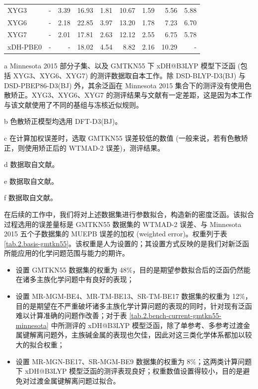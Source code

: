 \begin{table}
{\begin{tabular}{ld{1.3}d{1.3}d{2.2}d{2.2}d{2.2}d{2.2}d{2.2}d{2.2}}
  XYG3            
  & -               & 3.39 & 16.93      & 1.81        & 10.67      & 1.59       & 5.56       & 5.88     \\
  XYG6            
  & -               & 2.18 & 22.85      & 3.97        & 13.20      & 1.78       & 7.23       & 6.70     \\
  XYG7            
  & -               & 2.01 & 17.81      & 2.63        & 12.12      & 2.55       & 6.75       & 5.78     \\
  xDH-PBE0        
  & -               & -               & 18.02      & 4.54        & 8.82       & 2.16       & 10.29      & -        \\
  \bottomrule
  \end{tabular}
}{
  \item[a] Minnesota 2015 部分子集、以及 GMTKN55 下 xDH@B3LYP 模型下泛函 (包括 XYG3、XYG6、XYG7) 的测评数据取自本工作。除 DSD-BLYP-D3(BJ) 与 DSD-PBEP86-D3(BJ) 外，其余泛函在 Minnesota 2015 集合下的测评没有使用色散矫正。XYG3、XYG6、XYG7 的测评结果与文献\cite{Zhang-Xu.JPCL.2021}有一定差距，这是因为本工作与该文献使用了不同的基组与冻核近似规则。
  \item[b] 色散矫正模型均选用 DFT-D3(BJ)。
  \item[c] 在计算加权误差时，选取 GMTKN55 误差较低的数值 (一般来说，若有色散矫正，则使用矫正后的 WTMAD-2 误差)，测评结果。
  \item[d] 数据取自文献\cite{Goerigk-Grimme.PCCP.2017}。
  \item[e] 数据取自文献\cite{Mehta-Goerigk.PCCP.2018}。
  \item[f] 数据取自文献\cite{Santra-Martin.JPCA.2019}。
}
\end{table}

在后续的工作中，我们将对上述数据集进行参数拟合，构造新的密度泛函。该拟合过程选用的误差量标是 GMTKN55 数据集的 WTMAD-2 误差、与 Minnesota 2015 五个子数据集的 MUEPB 误差的加权 (weighted error)。权重列于表 \ref{tab.2.basis-gmtkn55}。该权重是人为设置的；其设置方式反映的是我们对新泛函所能应用的化学问题范围与能力的期许。
\begin{itemize}[nosep]
  \item 设置 GMTKN55 数据集的权重为 48\%，目的是期望参数拟合后的泛函仍然能在诸多主族化学问题中有良好的表现；
  \item 设置 MR-MGM-BE4、MR-TM-BE13、SR-TM-BE17 数据集的权重为 12\%，目的是期望在不严重破坏诸多主族化学计算问题的表现的同时，针对现有泛函难以计算准确的问题作改善；对于表 \ref{tab.2.bench-current-gmtkn55-minnesota} 中所测评的 xDH@B3LYP 模型泛函，除了单参考、多参考过渡金属键解离问题外，主族碱金属的表现也欠佳，因此对这三类化学体系都加以较大的拟合权重；
  \item 设置 MR-MGN-BE17、SR-MGM-BE9 数据集的权重为 8\%；这两类计算问题下 xDH@B3LYP 模型泛函的测评表现良好；权重数值设置得较小，目的是避免对过渡金属键解离问题过拟合。
\end{itemize}


